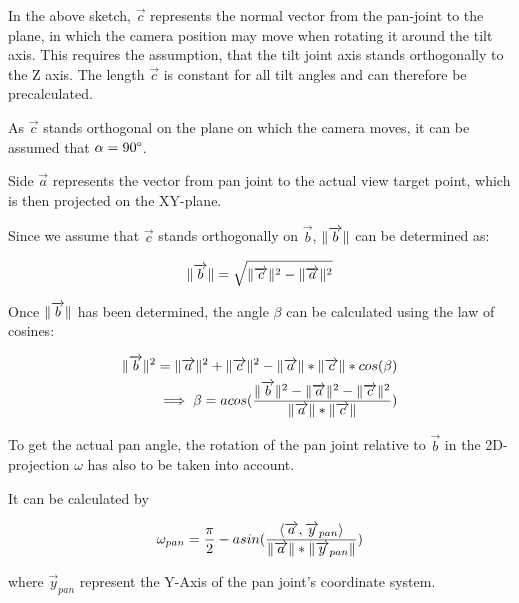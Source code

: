 \documentclass{article}
\DeclarePairedDelimiter\norm{\lVert}{\rVert}%
\begin{document}
In the above sketch, $\overrightarrow{c}$ represents the normal vector from the pan-joint to the plane, in which the camera position may move when rotating it around the tilt axis. This requires the assumption, that the tilt joint axis stands orthogonally to the Z axis. The length $\overrightarrow{c}$ is constant for all tilt angles and can therefore be precalculated.

As $\overrightarrow{c}$ stands orthogonal on the plane on which the camera moves, it can be assumed that $\alpha{}=90\degree$.

Side $\overrightarrow{a}$ represents the vector from pan joint to the actual view target point, which is then projected on the XY-plane.

Since we assume that $\overrightarrow{c}$ stands orthogonally on $\overrightarrow{b}$, $\norm{\overrightarrow{b}}$ can be determined as:

\begin{equation}
\norm{\overrightarrow{b}} = \sqrt{\norm{\overrightarrow{c}}^{2}-\norm{\overrightarrow{a}}^2}
\end{equation}

Once $\norm{\overrightarrow{b}}$ has been determined, the angle $\beta$ can be calculated using the law of cosines:

\begin{equation}
\begin{aligned}
\norm{\overrightarrow{b}}^2 = \norm{\overrightarrow{a}}^2 + \norm{\overrightarrow{c}}^2 - \norm{\overrightarrow{a}}*\norm{\overrightarrow{c}}*cos(\beta) \\
\implies 
\beta = acos(\frac{\norm{\overrightarrow{b}}^2 - \norm{\overrightarrow{a}}^2 - \norm{\overrightarrow{c}}^2}{\norm{\overrightarrow{a}}*\norm{\overrightarrow{c}}})
\end{aligned}
\end{equation}

To get the actual pan angle, the rotation of the pan joint relative to $\overrightarrow{b}$ in the 2D-projection $\omega$ has also to be taken into account.

It can be calculated by 

\begin{equation}
\omega_{pan}=\frac{\pi}{2}-asin(\frac{\langle\overrightarrow{a},\overrightarrow{y}_{pan}\rangle}{\norm{\overrightarrow{a}}*\norm{\overrightarrow{y}_{pan}}})
\end{equation}

where $\overrightarrow{y}_{pan}$ represent the Y-Axis of the pan joint's coordinate system.
\end{document}
